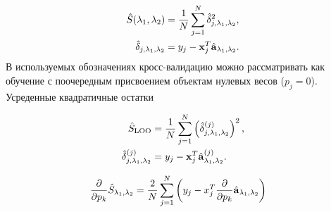 \begin{align}
	\hat S(\lambda_1, \lambda_2) &= \frac1N\sum_{j=1}^N \hat\delta_{j, \lambda_1, \lambda_2}^2, \\
	\hat \delta_{j, \lambda_1, \lambda_2} &= y_j - \boldsymbol{\mathbf{x}}_j^T \hat {\boldsymbol{\mathbf{a}}}_{\lambda_1, \lambda_2}.
\end{align}
В используемых обозначениях кросс-валидацию можно рассматривать как обучение с поочередным присвоением объектам нулевых весов ($p_j=0$).
Усреденные квадратичные остатки 


\begin{align}
	\hat{S}_{\text{LOO}}&=\frac1N\sum_{j=1}^N\left(\hat{\delta}_{j, \lambda_1, \lambda_2}^{(j)}\right)^2, \\
	\hat \delta_{j, \lambda_1, \lambda_2}^{(j)} &= y_j - \boldsymbol{\mathbf{x}}_j^T \hat {\boldsymbol{\mathbf{a}}}_{\lambda_1, \lambda_2}^{(j)}.
\end{align}

\begin{align}
	\frac{\partial}{\partial p_k}\hat{S}_{\lambda_1, \lambda_2}&= \frac2N\sum_{j=1}^N\left(y_j - x_j^T \frac{\partial}{\partial p_k}\hat {\boldsymbol{\mathbf{a}}}_{\lambda_1, \lambda_2}\right)
\end{align}
